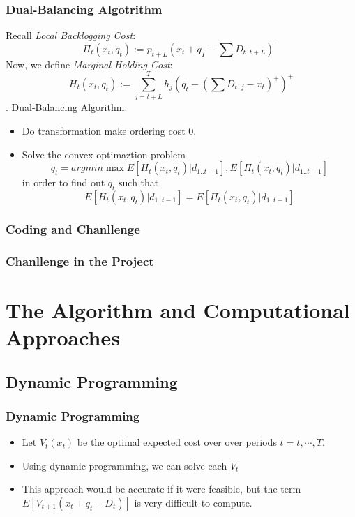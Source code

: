 \documentclass{beamer}
\begin{document}
\begin{frame}
    \frametitle{Dual-Balancing Algotrithm}
    Recall {\em Local Backlogging Cost}: 
    $$\Pi_t(x_t,q_t) := p_{t+L}(x_t + q_T - \sum D_{t..t+L})^{-}$$
    Now, we define {\em Marginal Holding Cost}:
    $$H_t(x_t,q_t) := \sum_{j = t+L}^{T} h_j (q_t - (\sum D_{t..j} - x_t)^+)^+$$.
    Dual-Balancing Algorithm:
    \begin{itemize}
      \item 
        Do transformation make ordering cost 0.
      \item
        Solve the convex optimaztion problem 
        $$q_t = argmin \max{E[H_t(x_t,q_t)| d_{1..t-1}], E[\Pi_t(x_t,q_t)| d_{1..t-1}]}$$
        in order to find out $q_t$ such that
        $$E[H_t(x_t,q_t)| d_{1..t-1}] = E[\Pi_t(x_t,q_t)| d_{1..t-1}]$$
    \end{itemize}
\end{frame}

\begin{frame}
    \frametitle{Coding and Chanllenge}    
    
\end{frame}

\begin{frame}
    \frametitle{Chanllenge in the Project}    
    
\end{frame}


  \section{The Algorithm and Computational Approaches}
    \subsection{Dynamic Programming}
    \begin{frame}
    \frametitle{Dynamic Programming}
      \begin{itemize}
        \item Let $V_{t}\left(x_{t}\right)$ be the optimal expected cost over over periods $t=t,\cdots,T.$
        \item Using dynamic programming, we can solve each $V_{t}$
        \item This approach would be accurate if it were feasible, but the term $E\left[V_{t+1}\left(x_{t}+q_{t}-D_{t}\right)\right]$ is very difficult to compute.
      \end{itemize}
    \end{frame}
\end{document}
